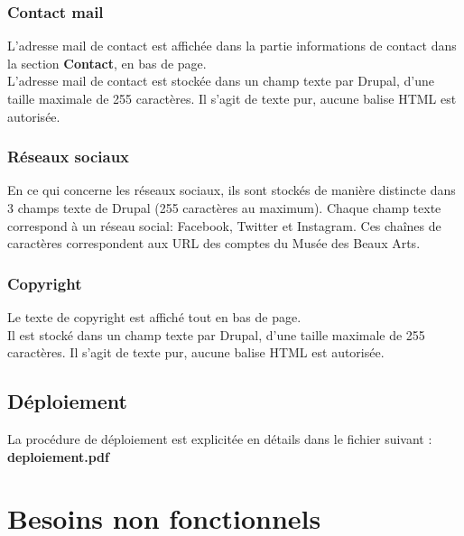 \documentclass[11pt]{report}
\begin{document}
\subsubsection{Contact mail}

L'adresse mail de contact est affichée dans la partie informations de
contact dans la section \textbf{Contact}, en bas de page. \\
L'adresse mail de contact est stockée dans un champ texte par Drupal, d'une taille
maximale de 255 caractères. Il s'agit de texte pur, aucune balise HTML est autorisée.

\subsubsection{Réseaux sociaux}

En ce qui concerne les réseaux sociaux, ils sont stockés de manière distincte
dans 3 champs texte de Drupal (255 caractères au maximum). Chaque champ texte
correspond à un réseau social: Facebook, Twitter et Instagram. Ces chaînes de
caractères correspondent aux URL des comptes du Musée des Beaux Arts.


\subsubsection{Copyright}

Le texte de copyright est affiché tout en bas de page. \\
Il est stocké dans un champ texte par Drupal, d'une taille maximale de 255
caractères. Il s'agit de texte pur, aucune balise HTML est autorisée.


\subsection*{Déploiement}
La procédure de déploiement est explicitée en détails dans le fichier
suivant : \textbf{deploiement.pdf}


\section{Besoins non fonctionnels}
\end{document}
